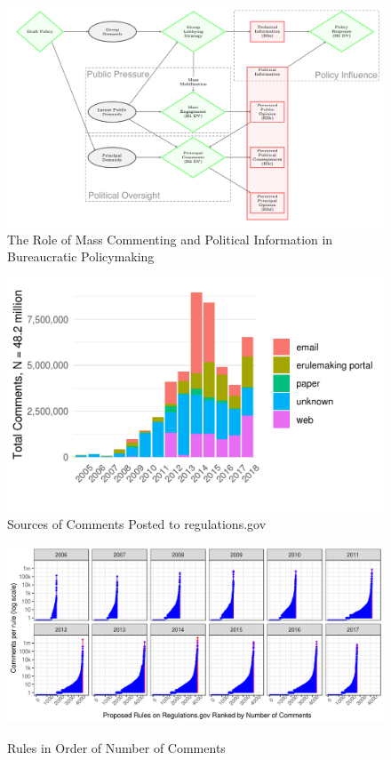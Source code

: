 \documentclass[
      12pt,
        ]{article}
\begin{document}
\begin{figure}

{\centering \includegraphics[width=6.5in]{../Figs/causal-full} 

}

\caption{The Role of Mass Commenting and Political Information in Bureaucratic Policymaking}\label{fig:causal-full}
\end{figure}

\begin{figure}

{\centering \includegraphics[width=6.5in]{../Figs/comments-form-1} 

}

\caption{Sources of Comments Posted to regulations.gov}\label{fig:comments-from}
\end{figure}

\begin{figure}[h!]
    \centering
        \caption{Rules in Order of Number of Comments}
    \includegraphics[width = 6.5in]{../Figs/rules-ranked-comments-per-year-1.png}
    \label{fig:rules-ranked}
\end{figure}
\end{document}
